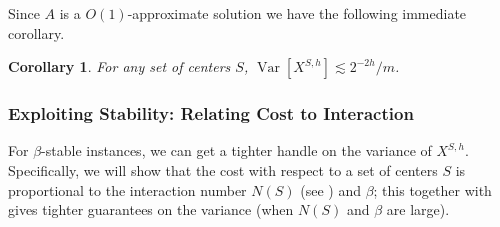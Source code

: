 \documentclass[11pt]{article}
\newtheorem{corollary}[lemma]{Corollary}
\theoremstyle{restate}
\theoremstyle{definition}
\DeclareMathOperator*{\var}{\mathrm{Var}}
\newcommand{\ccint}{N} %
\begin{document}
Since $A$ is a $O(1)$-approximate solution we have the following immediate corollary.
\begin{corollary}\label{lem: easy-var}
    For any set of centers $S$, $\var[X^{S,h}] \lesssim 2^{-2h}/m$.
\end{corollary}

\subsubsection{Exploiting Stability: Relating Cost to Interaction}
For $\beta$-stable instances, we can get a tighter handle on the variance of $X^{S,h}$. Specifically, we will show that the cost with respect to a set of centers $S$ is proportional to the interaction number $\ccint(S)$ (see ) and $\beta$; this together with  gives tighter guarantees on the variance (when $N(S)$ and $\beta$ are large).
\end{document}
